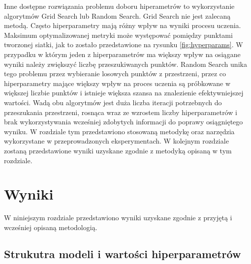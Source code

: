 \documentclass[oneside, mag]{mgr}
\begin{document}
Inne dostępne rozwiązania problemu doboru hiperametrów to wykorzystanie algorytmów Grid Search lub Random Search. Grid Search nie jest zalecaną metodą. Często hiperparametry mają różny wpływ na wyniki procesu uczenia. Maksimum optymalizowanej metryki może występować pomiędzy punktami tworzonej siatki, jak to zostało przedstawione na rysunku \ref{fig:hyperparams}. W przypadku w którym jeden z hiperparametrów ma większy wpływ na osiągane wyniki należy zwiększyć liczbę przeszukiwanych punktów. Random Search unika tego problemu przez wybieranie losowych punktów z przestrzeni, przez co hiperparametry mające większy wpływ na proces uczenia są próbkowane w większej liczbie punktów i istnieje większa szansa na znalezienie efektywniejszej wartości. Wadą obu algorytmów jest duża liczba iteracji potrzebnych do przeszukania przestrzeni, rosnąca wraz ze wzrostem liczby hiperparametrów i brak wykorzystywania wcześniej zdobytych informacji do poprawy osiągniętego wyniku. W rozdziale tym przedstawiono stosowaną metodykę oraz narzędzia wykorzystane w przeprowadzonych eksperymentach. W kolejnym rozdziale zostaną przedstawione wyniki uzyskane zgodnie z metodyką opisaną w tym rozdziale.


\chapter{Wyniki}

W niniejszym rozdziale przedstawiono wyniki uzyskane zgodnie z przyjętą i wcześniej opisaną metodologią.

\section{Strukutra modeli i wartości hiperparametrów}
\end{document}
